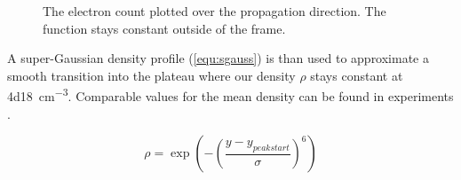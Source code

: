 \documentclass[bachelor_thesis]{subfiles}
\begin{document}
\begin{figure}
	\centering
	
	\caption{The electron count plotted over the propagation direction. The function stays constant outside of the frame.}
	\label{fig:dens}
\end{figure}

A super-Gaussian density profile (\autoref{equ:sgauss}) is than used to approximate a smooth transition into the plateau where our density $\rho$ stays constant at \qty{4d18}{\cm^{-3}}. Comparable values for the mean density can be found in experiments \cite{Schoebel2022, Kurz2021}. 

\begin{equation}
	\rho = \exp\left(-\left(\frac{y-y_{peak start}}{\sigma}\right)^6\right)
	\label{equ:sgauss}
\end{equation}
\end{document}
